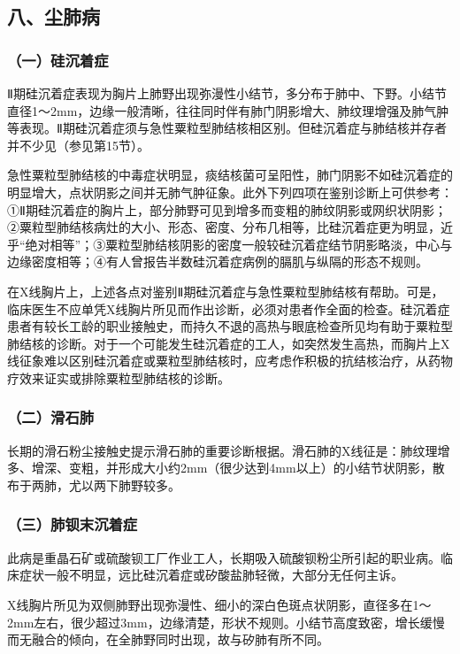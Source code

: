 \subsection{八、尘肺病}

\subsubsection{（一）硅沉着症}

Ⅱ期硅沉着症表现为胸片上肺野出现弥漫性小结节，多分布于肺中、下野。小结节直径1～2mm，边缘一般清晰，往往同时伴有肺门阴影增大、肺纹理增强及肺气肿等表现。Ⅱ期硅沉着症须与急性粟粒型肺结核相区别。但硅沉着症与肺结核并存者并不少见（参见第15节）。

急性粟粒型肺结核的中毒症状明显，痰结核菌可呈阳性，肺门阴影不如硅沉着症的明显增大，点状阴影之间并无肺气肿征象。此外下列四项在鉴别诊断上可供参考：①Ⅱ期硅沉着症的胸片上，部分肺野可见到增多而变粗的肺纹阴影或网织状阴影；②粟粒型肺结核病灶的大小、形态、密度、分布几相等，比硅沉着症更为明显，近乎“绝对相等”；③粟粒型肺结核阴影的密度一般较硅沉着症结节阴影略淡，中心与边缘密度相等；④有人曾报告半数硅沉着症病例的膈肌与纵隔的形态不规则。

在X线胸片上，上述各点对鉴别Ⅱ期硅沉着症与急性粟粒型肺结核有帮助。可是，临床医生不应单凭X线胸片所见而作出诊断，必须对患者作全面的检查。硅沉着症患者有较长工龄的职业接触史，而持久不退的高热与眼底检查所见均有助于粟粒型肺结核的诊断。对于一个可能发生硅沉着症的工人，如突然发生高热，而胸片上X线征象难以区别硅沉着症或粟粒型肺结核时，应考虑作积极的抗结核治疗，从药物疗效来证实或排除粟粒型肺结核的诊断。

\subsubsection{（二）滑石肺}

长期的滑石粉尘接触史提示滑石肺的重要诊断根据。滑石肺的X线征是：肺纹理增多、增深、变粗，并形成大小约2mm（很少达到4mm以上）的小结节状阴影，散布于两肺，尤以两下肺野较多。

\subsubsection{（三）肺钡末沉着症}

此病是重晶石矿或硫酸钡工厂作业工人，长期吸入硫酸钡粉尘所引起的职业病。临床症状一般不明显，远比硅沉着症或矽酸盐肺轻微，大部分无任何主诉。

X线胸片所见为双侧肺野出现弥漫性、细小的深白色斑点状阴影，直径多在1～2mm左右，很少超过3mm，边缘清楚，形状不规则。小结节高度致密，增长缓慢而无融合的倾向，在全肺野同时出现，故与矽肺有所不同。

